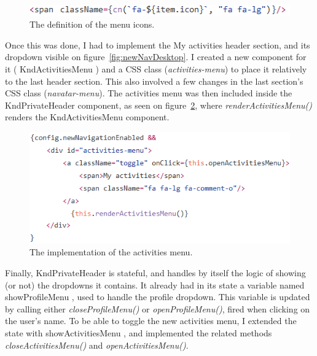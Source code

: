 \begin{figure}[H]
    \centering
    \includegraphics[scale=0.9]{figure/classnames.png}
    \caption{The definition of the menu icons.}
    \label{fig:classnames}
\end{figure}

Once this was done, I had to implement the \guillemotleft{} My activities \guillemotright{} header section, and its dropdown visible on {\sc figure}~\ref{fig:newNavDesktop}. I created a new component for it (\guillemotleft{} KndActivitiesMenu \guillemotright{}) and a CSS class (\textit{activities-menu}) to place it relatively to the last header section. This also involved a few changes in the last section's CSS class (\textit{navatar-menu}). The activities menu was then included inside the \guillemotleft{} KndPrivateHeader \guillemotright{} component, as seen on {\sc figure}~\ref{fig:activitiesImpl}, where \textit{renderActivitiesMenu()} renders the KndActivitiesMenu component.

\begin{figure}[H]
    \centering
    \includegraphics[scale=0.9]{figure/activitiesImpl.png}
    \caption{The implementation of the activities menu.}
    \label{fig:activitiesImpl}
\end{figure}

Finally, KndPrivateHeader is stateful, and handles by itself the logic of showing (or not) the dropdowns it contains. It already had in its state a variable named \guillemotleft{} showProfileMenu \guillemotright{}, used to handle the profile dropdown. This variable is updated by calling either \textit{closeProfileMenu()} or \textit{openProfileMenu()}, fired when clicking on the user's name. To be able to toggle the new activities menu, I extended the state with \guillemotleft{} showActivitiesMenu \guillemotright{}, and implemented the related methods \textit{closeActivitiesMenu()} and \textit{openActivitiesMenu()}.

